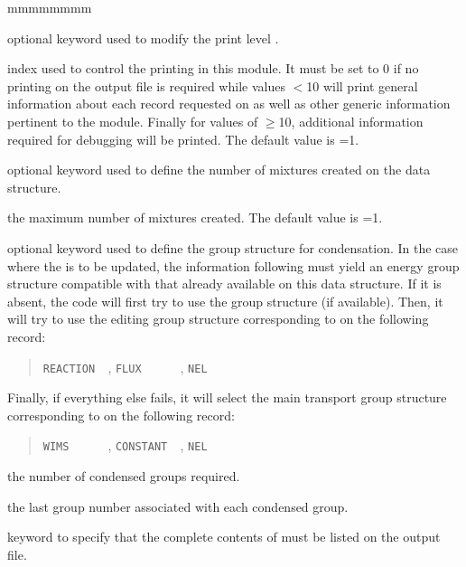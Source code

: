 \begin{ListeDeDescription}{mmmmmmmm}

\item[\moc{EDIT}] optional keyword used to modify the print level .

\item[\dusa{iprint}] index used to control the printing in this module. It
must be set to 0 if no printing on the output file is required while values
$<$10 will print general information about each record requested on  as well as other generic information
pertinent to the  module. Finally for values of 
$\ge$10, additional information required for debugging will be printed.
The default value is =1.

\item[\moc{NMIX}] optional keyword used to define the number of mixtures created on the  data structure.

\item[\dusa{nmixt}] the maximum number of mixtures created. The default value is =1.

\item[\moc{CONDG}] optional keyword used to define the group structure for condensation. In the case where the
 is to be updated, the information following  must yield an energy group structure compatible
with that already available on this data structure. If it is absent, the code will first try to use the 
group structure (if available). Then, it will try to use the editing group structure corresponding to  on
the following
 record:
\begin{quote}
\verb*|REACTION  |, \verb*|FLUX      |, \verb|NEL|
\end{quote}
Finally, if everything else fails, it will select the main transport group structure corresponding to  on the following
 record:
\begin{quote}
\verb*+WIMS      +, \verb*+CONSTANT  +, \verb+NEL+
\end{quote}

\item[\dusa{ngcond}] the number of condensed groups required.

\item[\dusa{ilg}] the last group number associated with each condensed group.

\item[\moc{LIST}] keyword to specify that the complete contents of  must be listed on the output file. 


\end{ListeDeDescription}
